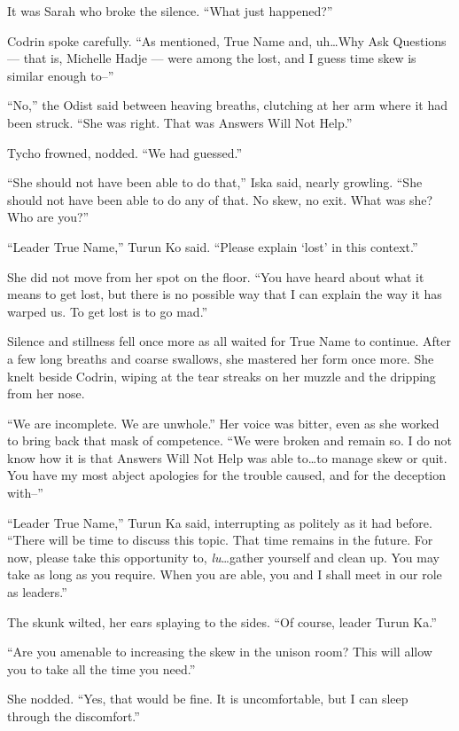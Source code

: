 It was Sarah who broke the silence. ``What just happened?''

Codrin spoke carefully. ``As mentioned, True Name and, uh\ldots Why Ask Questions — that is, Michelle Hadje — were among the lost, and I guess time skew is similar enough to--''

``No,'' the Odist said between heaving breaths, clutching at her arm where it had been struck. ``She was right. That was Answers Will Not Help.''

Tycho frowned, nodded. ``We had guessed.''

``She should not have been able to do that,'' Iska said, nearly growling. ``She should not have been able to do any of that. No skew, no exit. What was she? Who are you?''

``Leader True Name,'' Turun Ko said. ``Please explain `lost' in this context.''

She did not move from her spot on the floor. ``You have heard about what it means to get lost, but there is no possible way that I can explain the way it has warped us. To get lost is to go mad.''

Silence and stillness fell once more as all waited for True Name to continue. After a few long breaths and coarse swallows, she mastered her form once more. She knelt beside Codrin, wiping at the tear streaks on her muzzle and the dripping from her nose.

``We are incomplete. We are unwhole.'' Her voice was bitter, even as she worked to bring back that mask of competence. ``We were broken and remain so. I do not know how it is that Answers Will Not Help was able to\ldots to manage skew or quit. You have my most abject apologies for the trouble caused, and for the deception with--''

``Leader True Name,'' Turun Ka said, interrupting as politely as it had before. ``There will be time to discuss this topic. That time remains in the future. For now, please take this opportunity to, \emph{lu}\ldots gather yourself and clean up. You may take as long as you require. When you are able, you and I shall meet in our role as leaders.''

The skunk wilted, her ears splaying to the sides. ``Of course, leader Turun Ka.''

``Are you amenable to increasing the skew in the unison room? This will allow you to take all the time you need.''

She nodded. ``Yes, that would be fine. It is uncomfortable, but I can sleep through the discomfort.''

